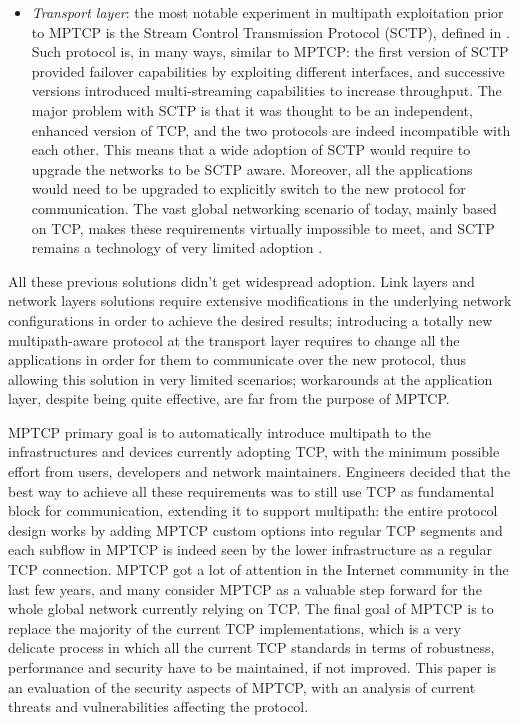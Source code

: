 \begin{itemize}
  \item \textit{Transport layer}: the most notable experiment in multipath exploitation prior to MPTCP is the Stream Control Transmission Protocol (SCTP), defined in . Such protocol is, in many ways, similar to MPTCP: the first version of SCTP provided failover capabilities by exploiting different interfaces, and successive versions introduced multi-streaming capabilities to increase throughput. The major problem with SCTP is that it was thought to be an independent, enhanced version of TCP, and the two protocols are indeed incompatible with each other. This means that a wide adoption of SCTP would require to upgrade the networks to be SCTP aware. Moreover, all the applications would need to be upgraded to explicitly switch to the new protocol for communication. The vast global networking scenario of today, mainly based on TCP, makes these requirements virtually impossible to meet, and SCTP remains a technology of very limited adoption \cite{ipspace}.
\end{itemize}

All these previous solutions didn't get widespread adoption. Link layers and network layers solutions require extensive modifications in the underlying network configurations in order to achieve the desired results; introducing a totally new multipath-aware protocol at the transport layer requires to change all the applications in order for them to communicate over the new protocol, thus allowing this solution in very limited scenarios; workarounds at the application layer, despite being quite effective, are far from the purpose of MPTCP.

MPTCP primary goal is to automatically introduce multipath to the infrastructures and devices currently adopting TCP, with the minimum possible effort from users, developers and network maintainers. Engineers decided that the best way to achieve all these requirements was to still use TCP as fundamental block for communication, extending it to support multipath: the entire protocol design works by adding MPTCP custom options into regular TCP segments and each subflow in MPTCP is indeed seen by the lower infrastructure as a regular TCP connection. 
MPTCP got a lot of attention in the Internet community in the last few years, and many consider MPTCP as a valuable step forward for the whole global network currently relying on TCP.
The final goal of MPTCP is to replace the majority of the current TCP implementations, which is a very delicate process in which all the current TCP standards in terms of robustness, performance and security have to be maintained, if not improved. This paper is an evaluation of the security aspects of MPTCP, with an analysis of current threats and vulnerabilities affecting the protocol.

